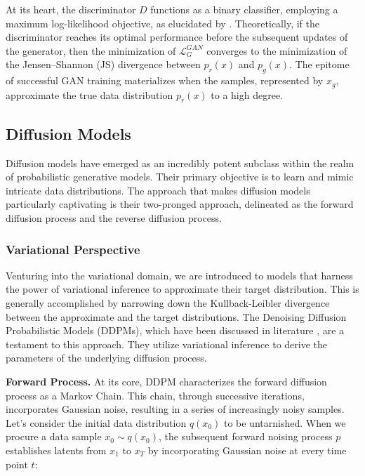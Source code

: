\documentclass[preprint,12pt,authoryear]{elsarticle}
\begin{document}
At its heart, the discriminator \(D\) functions as a binary classifier, employing a maximum log-likelihood objective, as elucidated by \cite{76_GAN_review}. Theoretically, if the discriminator reaches its optimal performance before the subsequent updates of the generator, then the minimization of \(\mathcal{L}^{GAN}_{G}\) converges to the minimization of the Jensen--Shannon (JS) divergence between \(p_r(x)\) and \(p_g(x)\). The epitome of successful GAN training materializes when the samples, represented by \(x_g\), approximate the true data distribution \(p_r(x)\) to a high degree.


\subsection{Diffusion Models}
Diffusion models have emerged as an incredibly potent subclass within the realm of probabilistic generative models. Their primary objective is to learn and mimic intricate data distributions. The approach that makes diffusion models particularly captivating is their two-pronged approach, delineated as the forward diffusion process and the reverse diffusion process.




\subsubsection{Variational Perspective}
Venturing into the variational domain, we are introduced to models that harness the power of variational inference to approximate their target distribution. This is generally accomplished by narrowing down the Kullback-Leibler divergence between the approximate and the target distributions. The Denoising Diffusion Probabilistic Models (DDPMs), which have been discussed in literature \cite{46_Diffusion,42_Diffusion}, are a testament to this approach. They utilize variational inference to derive the parameters of the underlying diffusion process.

\textbf{Forward Process.} 
At its core, DDPM characterizes the forward diffusion process as a Markov Chain. This chain, through successive iterations, incorporates Gaussian noise, resulting in a series of increasingly noisy samples. Let's consider the initial data distribution \(q\left(x_0\right)\) to be untarnished. When we procure a data sample \(x_0 \sim q\left(x_0\right)\), the subsequent forward noising process \(p\) establishes latents from \(x_1\) to \(x_T\) by incorporating Gaussian noise at every time point \(t\):
\end{document}

